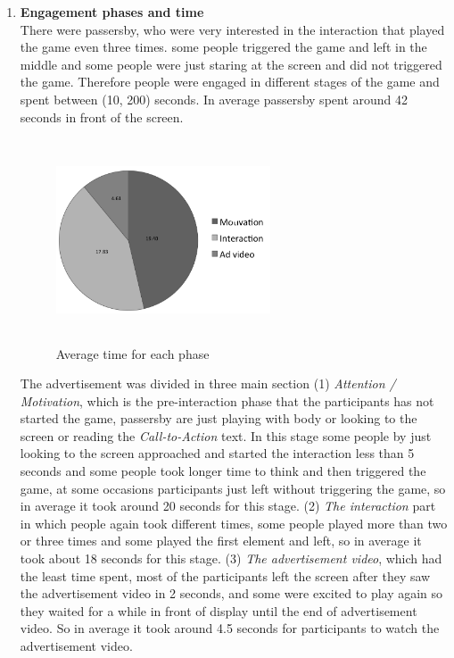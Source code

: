 \begin{enumerate}
\item \textbf{Engagement phases and time} \\
There were passersby, who were very interested in the interaction that played the game even three times. some people triggered the game and left in the middle and some people were just staring at the screen and did not triggered the game. Therefore people were engaged in different stages of the game and spent between (10, 200) seconds. In average passersby spent around 42 seconds in front of the screen.

\begin{figure}[H]
    \centering
    \includegraphics[width=0.6\textwidth,height=6cm]{Figures/8/body_inter_findings/body_avg_phases}
    \caption{Average time for each phase}%
    \label{fig:bodyaveragephases}%
\end{figure}

The advertisement was divided in three main section (1) \emph{Attention / Motivation}, which is the pre-interaction phase that the participants has not started the game, passersby are just playing with body or looking to the screen or reading the \emph{Call-to-Action} text. In this stage some people by just looking to the screen approached and started the interaction less than 5 seconds and some people took longer time to think and then triggered the game, at some occasions participants just left without triggering the game, so in average it took around 20 seconds for this stage. (2) \emph{The interaction} part in which people again took different times, some people played more than two or three times and some played the first element and left, so in average it took about 18 seconds for this stage. (3) \emph{The advertisement video}, which had the least time spent, most of the participants left the screen after they saw the advertisement video in 2 seconds, and some were excited to play again so they waited for a while in front of display until the end of advertisement video.  So in average it took around 4.5 seconds for participants to watch the advertisement video.



\end{enumerate}
